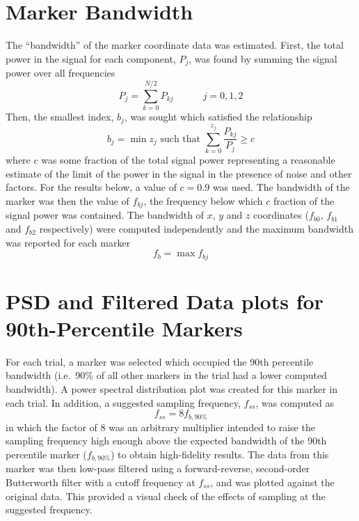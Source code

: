 \documentclass[
  a4paper,
  11pt,
  twoside,
  toc=flat,
  listof=flat
]{scrbook}
\begin{document}
\section{Marker Bandwidth}

The ``bandwidth'' of the marker coordinate data was estimated.  First, the total power in the signal for each component, $P_j$, was found by summing the signal power over all frequencies
\begin{equation}
P_j = \sum_{k=0}^{N/2} P_{kj} \hspace{3em} j = 0, 1, 2
\end{equation}
Then, the smallest index, $b_j$, was sought which satisfied the relationship
\begin{equation}
b_j = \min z_j \text{ such that } \sum_{k=0}^{z_j} \frac{P_{kj}}{P_j} \ge c
\end{equation}
where $c$ was some fraction of the total signal power representing a reasonable estimate of the limit of the power in the signal in the presence of noise and other factors.  For the results below, a value of $c = 0.9$ was used.  The bandwidth of the marker was then the value of $f_{bj}$, the frequency below which $c$ fraction of the signal power was contained.  The bandwidth of $x$, $y$ and $z$ coordinates ($f_{b0}$, $f_{b1}$ and $f_{b2}$ respectively) were computed independently and the maximum bandwidth was reported for each marker
\begin{equation}
f_b = \max f_{bj}
\end{equation}

\section{PSD and Filtered Data plots for 90th-Percentile Markers}

For each trial, a marker was selected which occupied the 90th percentile bandwidth (i.e.\ 90\% of all other markers in the trial had a lower computed bandwidth).  A power spectral distribution plot was created for this marker in each trial.  In addition, a suggested sampling frequency, $f_{ss}$, was computed as
\begin{equation}
f_{ss} = 8 f_{b,90\%}
\end{equation}
in which the factor of 8 was an arbitrary multiplier intended to raise the sampling frequency high enough above the expected bandwidth of the 90th percentile marker ($f_{b,90\%}$) to obtain high-fidelity results.  The data from this marker was then low-pass filtered using a forward-reverse, second-order Butterworth filter with a cutoff frequency at $f_{ss}$, and was plotted against the original data.  This provided a visual check of the effects of sampling at the suggested frequency.
\end{document}
